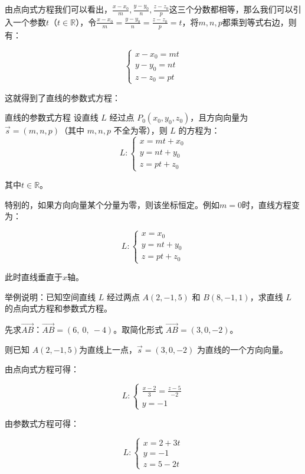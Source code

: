 由点向式方程我们可以看出，$\frac{x-x_0}{m} , \frac{y-y_0}{n} , \frac{z-z_0}{p}$这三个分数都相等，那么我们可以引入一个参数$t$（$t\in\mathbb{R}$），令$\frac{x-x_0}{m} = \frac{y-y_0}{n} = \frac{z-z_0}{p} = t$，将$m,n,p$都乘到等式右边，则有：

$$\begin{cases}
  x-x_0=mt\\
  y-y_0=nt\\
  z-z_0=pt
\end{cases}$$

这就得到了直线的参数式方程：

\begin{definition}{直线的参数式方程}{}
设直线 $L$ 经过点 $P_0(x_0,y_0,z_0)$，且方向向量为 $\vec{s}=(m,n,p)$（其中 $m,n,p$ 不全为零），则 $L$ 的方程为：
$$L: \begin{cases}
  x=mt+x_0\\
  y=nt+y_0\\
  z=pt+z_0
\end{cases}$$

其中$t\in\mathbb{R}$。

特别的，如果方向向量某个分量为零，则该坐标恒定。例如$m=0$时，直线方程变为：

$$L: \begin{cases}
  x=x_0\\
  y=nt+y_0\\
  z=pt+z_0
\end{cases}$$

此时直线垂直于$x$轴。
\end{definition}

\begin{myexample}
  举例说明：已知空间直线 \(L\) 经过两点 \(A(2, -1, 5)\) 和 \(B(8, -1, 1)\)，求直线 \(L\) 的点向式方程和参数式方程。

  先求\(\overrightarrow{AB}\)：\(\overrightarrow{AB} = (6,\ 0,\ -4)\)。取简化形式 \(\overrightarrow{AB} = (3,0,-2)\)。

  则已知 \(A(2, -1, 5)\)为直线上一点，\(\vec{s} = (3,0,-2)\) 为直线的一个方向向量。

  由点向式方程可得：

  \[
  L: \begin{cases}
  \frac{x-2}{3} = \frac{z-5}{-2}\\
  y = -1\end{cases}
  \]

  由参数式方程可得：

  \[
  L: \begin{cases}
    x = 2 + 3t \\
    y = -1 \\
    z = 5 - 2t
  \end{cases}
  \]

\end{myexample}


